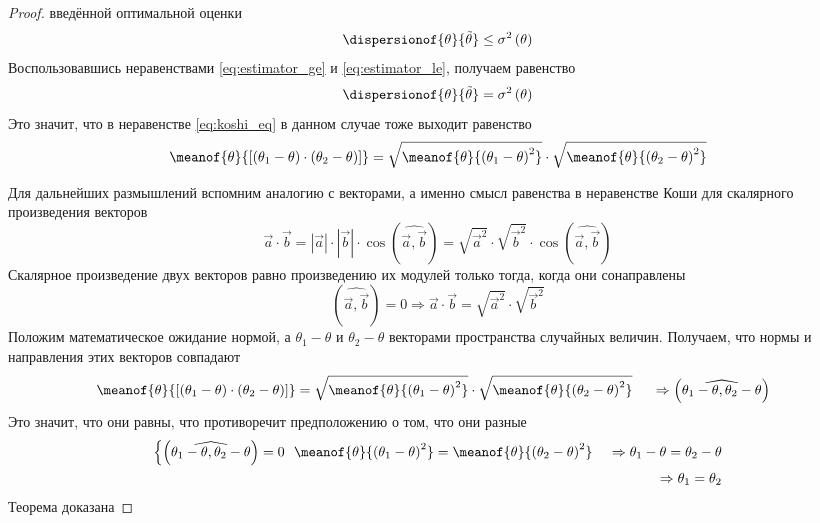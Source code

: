 \begin{proof}
  введённой оптимальной оценки
  \begin{equation}\label{eq:estimator_le}
    \dispersionof{\theta}{\tilde{\theta}}\le\sigma^2\left(\theta\right)
  \end{equation}
  Воспользовавшись неравенствами
  \eqref{eq:estimator_ge} и \eqref{eq:estimator_le}, получаем равенство
  $$\dispersionof{\theta}{\tilde{\theta}}= \sigma^2\left(\theta\right)$$
  Это значит, что в неравенстве \eqref{eq:koshi_eq}
  в данном случае тоже выходит равенство
  $$\meanof{\theta}{\left[ \left( \theta_1-\theta \right)
      \cdot\left( \theta_2-\theta \right) \right]}
    = \sqrt{\meanof{\theta}{\left( \theta_1-\theta \right)^2}}
      \cdot\sqrt{\meanof{\theta}{\left( \theta_2-\theta \right)^2}}$$

  Для дальнейших размышлений вспомним аналогию с векторами,
  а именно смысл равенства в неравенстве Коши
  для скалярного произведения векторов
  $$\vec{a}\cdot\vec{b}
    = \left|\vec{a}\right|\cdot\left|\vec{b}\right|
      \cdot\cos{\left(\widehat{\vec{a},\vec{b}}\right)}
    = \sqrt{\vec{a}^2}\cdot\sqrt{\vec{b}^2}
      \cdot\cos{\left(\widehat{\vec{a},\vec{b}}\right)}$$
  Скалярное произведение двух векторов равно произведению их модулей
  только тогда, когда они сонаправлены
  $$\left(\widehat{\vec{a},\vec{b}}\right)=0
    \Rightarrow \vec{a}\cdot\vec{b}
    = \sqrt{\vec{a}^2}\cdot\sqrt{\vec{b}^2}$$
  Положим математическое ожидание нормой,
  а $\theta_1-\theta$ и $\theta_2-\theta$ векторами
  пространства случайных величин.
  Получаем, что нормы и направления этих векторов совпадают
  \begin{align*}
    &\meanof{\theta}{\left[ \left( \theta_1-\theta \right)
      \cdot\left( \theta_2-\theta \right) \right]}
    = \sqrt{\meanof{\theta}{\left( \theta_1-\theta \right)^2}}
      \cdot\sqrt{\meanof{\theta}{\left( \theta_2-\theta \right)^2}}\ \
    &\Rightarrow\left(\widehat{\theta_1-\theta,\theta_2-\theta}\right)\ \
    \end{align*}
  Это значит, что они равны,
  что противоречит предположению о том, что они разные
  \begin{align*}
    \begin{cases}
      \left(\widehat{\theta_1-\theta,\theta_2-\theta}\right)=0\ \
      \meanof{\theta}{\left( \theta_1-\theta \right)^2}
        = \meanof{\theta}{\left( \theta_2-\theta \right)^2}
    \end{cases}
    \Rightarrow \theta_1-\theta= \theta_2-\theta\\
    \Rightarrow\theta_1= \theta_2
  \end{align*}
  Теорема доказана
\end{proof}

